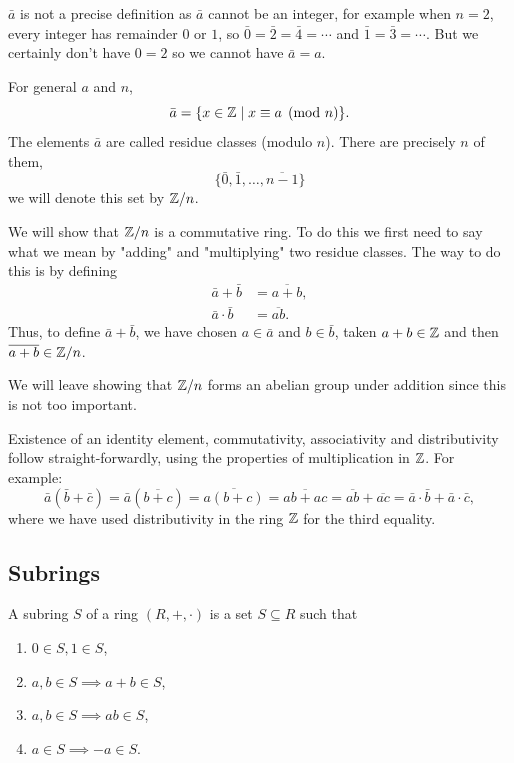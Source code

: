 \documentclass[10pt, a4paper]{article}
\begin{document}
$\bar{a}$ is not a precise definition as $\bar{a}$ cannot be an integer,
for example when $n = 2$,
every integer has remainder $0$ or $1$,
so $\bar{0} = \bar{2} = \bar{4} = \dotsi$ and $\bar{1} = \bar{3} = \dotsi$.
But we certainly don't have $0 = 2$ so we cannot have $\bar{a} = a$.

For general $a$ and $n$,
\[
\bar{a} = \{x \in \mathbb{Z} \mid x \equiv a\pmod{n}\}.
\]
The elements $\bar{a}$ are called residue classes
(modulo $n$).
There are precisely $n$ of them,
\[
\{\bar{0}, \bar{1}, \dotsc, \overline{n - 1}\}
\]
we will denote this set by $\mathbb{Z} / n$.

\begin{example}
    We will show that $\mathbb{Z} / n$ is a commutative ring.
    To do this we first need to say what we mean by "adding" and "multiplying" two residue classes.
    The way to do this is by defining
    \begin{align*}
        \bar{a} + \bar{b} &= \overline{a + b}, \\
        \bar{a} \cdot \bar{b} &= \overline{ab}.
    \end{align*}
    Thus,
    to define $\bar{a} + \bar{b}$,
    we have chosen $a \in \bar{a}$ and $b \in \bar{b}$,
    taken $a + b \in \mathbb{Z}$ and then $\overline{a + b} \in \mathbb{Z} / n$.

    We will leave showing that $\mathbb{Z} / n$ forms an abelian group under addition since this is not too important.

    Existence of an identity element,
    commutativity,
    associativity and distributivity follow straight-forwardly,
    using the properties of multiplication in $\mathbb{Z}$.
    For example:
    \[
    \bar{a}(\bar{b} + \bar{c}) = \bar{a}(\overline{b + c}) = \overline{a(b + c)} = \overline{ab + ac} = \overline{ab} + \overline{ac} = \bar{a}\cdot\bar{b} + \bar{a}\cdot\bar{c},
    \]
    where we have used distributivity in the ring $\mathbb{Z}$ for the third equality.
\end{example}

\subsection{Subrings}

\begin{definition}[Subring]
    A subring $S$ of a ring $(R, +, \cdot)$ is a set $S \subseteq R$ such that
    \begin{enumerate}[label = \roman*)]
        \item $0 \in S, 1 \in S$,

        \item $a, b \in S \implies a + b \in S$,

        \item $a, b \in S \implies ab \in S$,

        \item $a \in S \implies -a \in S$.
    \end{enumerate}
\end{definition}
\end{document}
